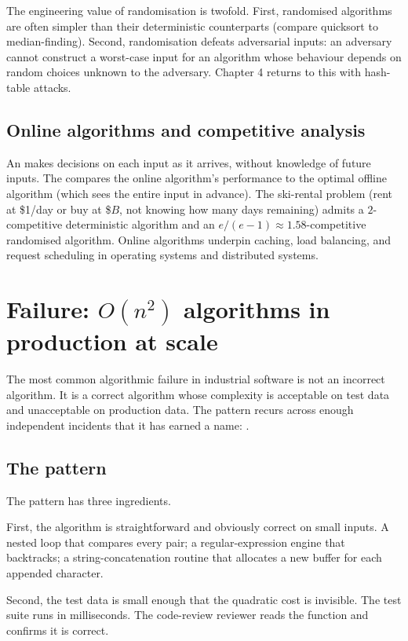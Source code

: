 The engineering value of randomisation is twofold. First, randomised algorithms are often simpler than their deterministic counterparts (compare quicksort to median-finding). Second, randomisation defeats adversarial inputs: an adversary cannot construct a worst-case input for an algorithm whose behaviour depends on random choices unknown to the adversary. Chapter 4 returns to this with hash-table attacks.

\subsection{Online algorithms and competitive analysis}

An  makes decisions on each input as it arrives, without knowledge of future inputs. The  compares the online algorithm's performance to the optimal offline algorithm (which sees the entire input in advance). The ski-rental problem (rent at \$1/day or buy at \$$B$, not knowing how many days remaining) admits a $2$-competitive deterministic algorithm and an $e/(e-1) \approx 1.58$-competitive randomised algorithm. Online algorithms underpin caching, load balancing, and request scheduling in operating systems and distributed systems.

\section{Failure: \texorpdfstring{$O(n^2)$}{O(n²)} algorithms in production at scale}

The most common algorithmic failure in industrial software is not an incorrect algorithm. It is a correct algorithm whose complexity is acceptable on test data and unacceptable on production data. The pattern recurs across enough independent incidents that it has earned a name: .

\subsection{The pattern}

The pattern has three ingredients.

First, the algorithm is straightforward and obviously correct on small inputs. A nested loop that compares every pair; a regular-expression engine that backtracks; a string-concatenation routine that allocates a new buffer for each appended character.

Second, the test data is small enough that the quadratic cost is invisible. The test suite runs in milliseconds. The code-review reviewer reads the function and confirms it is correct.

